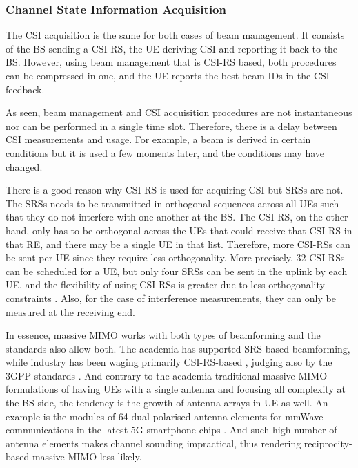 \subsubsection*{Channel State Information Acquisition}

The CSI acquisition is the same for both cases of beam management. It consists of the BS sending a CSI-RS, the UE deriving CSI and reporting it back to the BS. However, using beam management that is CSI-RS based, both procedures can be compressed in one, and the UE reports the best beam IDs in the CSI feedback.

As seen, beam management and CSI acquisition procedures are not instantaneous nor can be performed in a single time slot. Therefore, there is a delay between CSI measurements and usage. For example, a beam is derived in certain conditions but it is used a few moments later, and the conditions may have changed. 

There is a good reason why CSI-RS is used for acquiring CSI but SRSs are not. The SRSs needs to be transmitted in orthogonal sequences across all UEs such that they do not interfere with one another at the BS. The CSI-RS, on the other hand, only has to be orthogonal across the UEs that could receive that CSI-RS in that RE, and there may be a single UE in that list. Therefore, more CSI-RSs can be sent per UE since they require less orthogonality. More precisely, 32 CSI-RSs can be scheduled for a UE, but only four SRSs can be sent in the uplink by each UE, and the flexibility of using CSI-RSs is greater due to less orthogonality constraints \cite{DAHLMAN2018}. Also, for the case of interference measurements, they can only be measured at the receiving end.

In essence, massive MIMO works with both types of beamforming and the standards also allow both. The academia has supported SRS-based beamforming, while industry has been waging primarily CSI-RS-based \cite{tddVSfdd_massiveMIMO}, judging also by the 3GPP standards \cite{3gpp-codebooks}. And contrary to the academia traditional massive MIMO formulations of having UEs with a single antenna and focusing all complexity at the BS side, the tendency is the growth of antenna arrays in \acs{UE} as well. An example is the modules of 64 dual-polarised antenna elements for mmWave communications in the latest 5G smartphone chips \cite{qualcomm_64_antenna}. And such high number of antenna elements makes channel sounding impractical, thus rendering reciprocity-based massive MIMO less likely.

